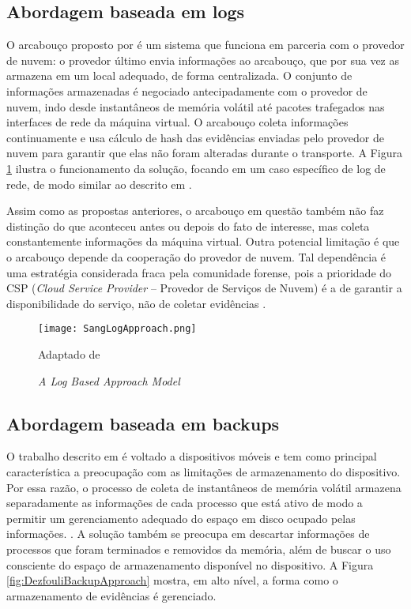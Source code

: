 \subsection{Abordagem baseada em logs}
\label{sec:modelologs}

O arcabouço proposto por \cite{SangLogApproach:2013} é um sistema que funciona em parceria com o provedor de nuvem: o provedor último envia informações ao arcabouço, que por sua vez as armazena em um local adequado, de forma centralizada.
%
O conjunto de informações armazenadas é negociado antecipadamente com o provedor de nuvem, indo desde instantâneos de memória volátil até pacotes trafegados nas interfaces de rede da máquina virtual.
%
O arcabouço coleta informações continuamente e usa cálculo de hash das evidências enviadas pelo provedor de nuvem para garantir que elas não foram alteradas durante o transporte.
%
A Figura \ref{fig:SangLogApproach} ilustra o funcionamento da solução, focando em um caso específico de log de rede, de modo similar ao descrito em \cite{SangLogApproach:2013}.


Assim como as propostas anteriores, o arcabouço em questão também não faz distinção do que aconteceu antes ou depois do fato de interesse, mas  coleta constantemente informações da máquina virtual.
%
Outra potencial limitação é que o arcabouço depende da cooperação do provedor de nuvem. 
%
Tal dependência é uma estratégia considerada fraca pela comunidade forense, pois a prioridade do CSP (\textit{Cloud Service Provider} -- Provedor de Serviços de Nuvem) é a de garantir a disponibilidade do serviço, não de coletar evidências \cite{ClarkeReviewOfChallenges2015}.
%

\begin{figure}[htb!]
\footnotesize
\caption{\textit{A Log Based Approach Model}}
\texttt{[image: SangLogApproach.png]}
\centering
\label{fig:SangLogApproach}
\begin{center}
Adaptado de \cite{SangLogApproach:2013} 
\end{center}
\end{figure}


\subsection{Abordagem baseada em backups}
\label{sec:modelobackup}

O trabalho descrito em \cite{DezfouliBackupApproach:2012} é voltado a dispositivos móveis e tem como principal característica a preocupação com as limitações de armazenamento do dispositivo.
%
Por essa razão, o processo de coleta de instantâneos de memória volátil armazena separadamente as informações de cada processo que está ativo de modo a permitir um gerenciamento adequado do espaço em disco ocupado pelas informações. 
.
%
A solução também se preocupa em descartar informações de processos que foram terminados e removidos da memória, além de buscar o uso consciente do espaço de armazenamento disponível no dispositivo.
%
A Figura \ref{fig:DezfouliBackupApproach} mostra, em alto nível, a forma como o armazenamento de evidências é gerenciado.


